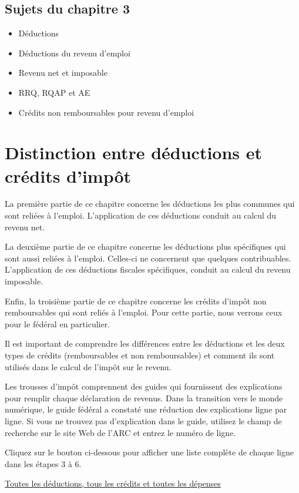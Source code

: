 \subsection{Sujets du chapitre 3}
\begin{itemize}
	\item Déductions
	\item Déductions du revenu d'emploi
	\item Revenu net et imposable
	\item RRQ, RQAP et AE
	\item Crédits non remboursables pour revenu d'emploi
\end{itemize}



\section{Distinction entre déductions et crédits d'impôt}
\begin{intro}
	La première partie de ce chapitre concerne les déductions les plus communes qui sont reliées à l'emploi. L'application de ces déductions conduit au calcul du revenu net.
	
	La deuxième partie de ce chapitre concerne les déductions plus spécifiques qui sont aussi reliées à l'emploi. Celles-ci ne concernent que quelques contribuables. L'application de ces déductions fiscales spécifiques, conduit au calcul du revenu imposable.
	
	Enfin, la troisième partie de ce chapitre concerne les crédits d'impôt non remboursables qui sont reliés à l'emploi. Pour cette partie, nous verrons ceux pour le fédéral en particulier.
	
	Il est important de comprendre les différences entre les déductions et les deux types de crédits (remboursables et non remboursables) et comment ils sont utilisés dans le calcul de l'impôt sur le revenu.
\end{intro}
\begin{note}
	Les trousses d'impôt comprennent des guides qui fournissent des explications pour remplir chaque déclaration de revenus. Dans la transition vers le monde numérique, le guide fédéral a constaté une réduction des explications ligne par ligne. Si vous ne trouvez pas d'explication dans le guide, utilisez le champ de recherche sur le site Web de l'ARC et entrez le numéro de ligne.
	
	Cliquez sur le bouton ci-dessous pour afficher une liste complète de chaque ligne dans les étapes 3 à 6.
	
	\href{https://www.canada.ca/fr/agence-revenu/services/impot/particuliers/sujets/tout-votre-declaration-revenus/declaration-revenus/remplir-declaration-revenus/deductions-credits-depenses/toutes-deductions-tous-credits-toutes-depenses.html}{Toutes les déductions, tous les crédits et toutes les dépenses}
\end{note}



